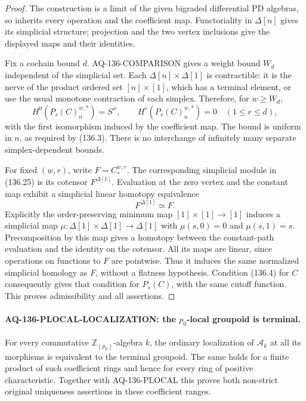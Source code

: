 \begin{proof}
The construction is a limit of the given bigraded differential
PD algebras, so inherits every operation and the coefficient
map.  Functoriality in $\Delta[n]$ gives its simplicial
structure; projection and the two vertex inclusions give
the displayed maps and their identities.

Fix a cochain bound $d$.  AQ-136-COMPARISON gives a weight
bound $W_d$ independent of the simplicial set.  Each
$\Delta[n]\times\Delta[1]$ is contractible: it is the nerve
of the product ordered set $[n]\times[1]$, which has a
terminal element, or use the usual monotone contraction of
each simplex.  Therefore, for $w\geq W_d$,
\[
 H^0(P_s(C)_n^{w,*})=S^w,\qquad
 H^r(P_s(C)_n^{w,*})=0\quad(1\leq r\leq d),                \tag{136.26}
\]
with the first isomorphism induced by the coefficient map.
The bound is uniform in $n$, as required by (136.3).
There is no interchange of infinitely many separate
simplex-dependent bounds.

For fixed $(w,r)$, write $F=C_*^{w,r}$.  The corresponding
simplicial module in (136.25) is its cotensor
$F^{\Delta[1]}$.  Evaluation at the zero vertex and the
constant map exhibit a simplicial linear homotopy
equivalence
\[
                       F^{\Delta[1]}\simeq F.              \tag{136.27}
\]
Explicitly the order-preserving minimum map
$[1]\times[1]\to[1]$ induces a simplicial map
$\mu:\Delta[1]\times\Delta[1]\to\Delta[1]$
with $\mu(s,0)=0$ and $\mu(s,1)=s$.
Precomposition by this map gives a homotopy between the
constant-path evaluation and the identity on the cotensor.
All its maps are linear, since operations on functions to
$F$ are pointwise.  Thus it induces the same normalized
simplicial homology as $F$, without a flatness hypothesis.
Condition (136.4) for $C$ consequently gives that condition
for $P_s(C)$, with the same cutoff function.  This proves
admissibility and all assertions.
\end{proof}

\paragraph{AQ-136-PLOCAL-LOCALIZATION: the $p_0$-local groupoid is terminal.}
For every commutative $\mathbb Z_{(p_0)}$-algebra $k$, the
ordinary localization of $\mathcal A_k$ at all its morphisms
is equivalent to the terminal groupoid.  The same holds
for a finite product of such coefficient rings and hence
for every ring of positive characteristic.  Together with
AQ-136-PLOCAL this proves both non-strict original
uniqueness assertions in these coefficient ranges.

